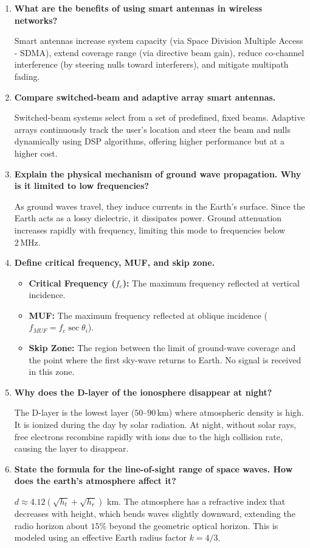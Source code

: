 \documentclass[12pt,a4paper]{article}
\newcommand{\Q}[1]{\textbf{#1}\par\noindent\ignorespaces}
\begin{document}
\begin{tcolorbox}[exambox, title={\textbf{Frequently Asked / Viva Questions}}]
\begin{enumerate}[topsep=0pt, label=\textbf{Q\arabic*.}, itemsep=5pt]
  \item \Q{What are the benefits of using smart antennas in wireless networks?}
    Smart antennas increase system capacity (via Space Division Multiple Access - SDMA), extend coverage range (via directive beam gain), reduce co-channel interference (by steering nulls toward interferers), and mitigate multipath fading.
  \item \Q{Compare switched-beam and adaptive array smart antennas.}
    Switched-beam systems select from a set of predefined, fixed beams. Adaptive arrays continuously track the user's location and steer the beam and nulls dynamically using DSP algorithms, offering higher performance but at a higher cost.
  \item \Q{Explain the physical mechanism of ground wave propagation. Why is it limited to low frequencies?}
    As ground waves travel, they induce currents in the Earth's surface. Since the Earth acts as a lossy dielectric, it dissipates power. Ground attenuation increases rapidly with frequency, limiting this mode to frequencies below $2\,\text{MHz}$.
  \item \Q{Define critical frequency, MUF, and skip zone.}
    \begin{itemize}[leftmargin=*, itemsep=1pt, topsep=2pt]
      \item \textbf{Critical Frequency ($f_c$):} The maximum frequency reflected at vertical incidence.
      \item \textbf{MUF:} The maximum frequency reflected at oblique incidence ($f_{MUF} = f_c \sec\theta_i$).
      \item \textbf{Skip Zone:} The region between the limit of ground-wave coverage and the point where the first sky-wave returns to Earth. No signal is received in this zone.
    \end{itemize}
  \item \Q{Why does the D-layer of the ionosphere disappear at night?}
    The D-layer is the lowest layer ($50$–$90\,\text{km}$) where atmospheric density is high. It is ionized during the day by solar radiation. At night, without solar rays, free electrons recombine rapidly with ions due to the high collision rate, causing the layer to disappear.
  \item \Q{State the formula for the line-of-sight range of space waves. How does the earth's atmosphere affect it?}
    $d \approx 4.12 (\sqrt{h_t} + \sqrt{h_r})$ km. The atmosphere has a refractive index that decreases with height, which bends waves slightly downward, extending the radio horizon about $15\%$ beyond the geometric optical horizon. This is modeled using an effective Earth radius factor $k = 4/3$.
\end{enumerate}
\end{tcolorbox}
\end{document}
